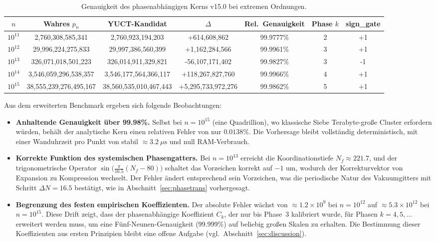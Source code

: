 \documentclass[11pt,a4paper]{article}
\begin{document}
	\begin{table}[htbp]
		\centering
		\caption{Genauigkeit des phasenabhängigen Kerns v15.0 bei extremen Ordnungen.}
		\label{tab:benchmark-extreme}
		\begin{tabular}{c c c c c c c}
			\toprule
			\(n\) & Wahres \(p_n\) & YUCT-Kandidat & \(\Delta\) & Rel.\ Genauigkeit & Phase \(k\) & sign\_gate \\
			\midrule
			\(10^{11}\) & 2,760,308,585,341 & 2,760,923,194,203 & +614,608,862   & 99.9777\% & 2 & +1 \\
			\(10^{12}\) & 29,996,224,275,833 & 29,997,386,560,399 & +1,162,284,566 & 99.9961\% & 3 & +1 \\
			\(10^{13}\) & 326,071,018,501,223 & 326,014,911,329,821 & -56,107,171,402 & 99.9827\% & 3 & -1 \\
			\(10^{14}\) & 3,546,059,296,538,357 & 3,546,177,564,366,117 & +118,267,827,760 & 99.9966\% & 4 & +1 \\
			\(10^{15}\) & 38,555,239,276,495,167 & 38,560,535,010,467,443 & +5,295,733,972,276 & 99.9862\% & 5 & +1 \\
			\bottomrule
		\end{tabular}
	\end{table}
	
	Aus dem erweiterten Benchmark ergeben sich folgende Beobachtungen:
	
	\begin{itemize}
		\item \textbf{Anhaltende Genauigkeit über 99.98\%.}
		Selbst bei \(n = 10^{15}\) (eine Quadrillion), wo klassische Siebe
		Terabyte-große Cluster erfordern würden, behält der analytische Kern
		einen relativen Fehler von nur \(0.0138\%\). Die Vorhersage bleibt
		vollständig deterministisch, mit einer Wanduhrzeit pro Punkt von
		stabil \(\approx 3.2\ \mu\text{s}\) und null RAM-Verbrauch.
		
		\item \textbf{Korrekte Funktion des systemischen Phasengatters.}
		Bei \(n = 10^{13}\) erreicht die Koordinationstiefe \(N_f \approx 221.7\),
		und der trigonometrische Operator \(\sin\!\bigl(\frac{\pi}{16.5}(N_f-80)\bigr)\)
		schaltet das Vorzeichen korrekt auf \(-1\) um, wodurch der Korrekturvektor
		von Expansion zu Kompression wechselt. Der Fehler ändert entsprechend
		sein Vorzeichen, was die periodische Natur des Vakuumgitters mit Schritt
		\(\Delta N = 16.5\) bestätigt, wie in Abschnitt~\ref{sec:phasetrans}
		vorhergesagt.
		
		\item \textbf{Begrenzung des festen empirischen Koeffizienten.}
		Der absolute Fehler wächst von \(\approx 1.2\times 10^{9}\) bei
		\(n = 10^{12}\) auf \(\approx 5.3\times 10^{12}\) bei
		\(n = 10^{15}\). Diese Drift zeigt, dass der phasenabhängige
		Koeffizient \(C_k\), der nur bis Phase~3 kalibriert wurde, für
		Phasen \(k = 4, 5, \dots\) erweitert werden muss, um eine
		Fünf-Neunen-Genauigkeit (99.999\%) auf beliebig großen Skalen
		zu erhalten. Die Bestimmung dieser Koeffizienten aus ersten
		Prinzipien bleibt eine offene Aufgabe (vgl.\ Abschnitt~\ref{sec:discussion}).
	\end{itemize}
	
\end{document}
